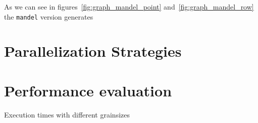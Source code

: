 
As we can see in figures~\ref{fig:graph_mandel_point} and~\ref{fig:graph_mandel_row} the \texttt{mandel} version generates %



\section{Parallelization Strategies}%
\label{sec:Parallelization Strategies}



\section{Performance evaluation}%
\label{sec:Performance evaluation}


\begin{table}[H]
    \caption{Execution times with different grainsizes}%
    \label{tab:grainsize}
    \begin{center}
    
    \end{center}
\end{table}

